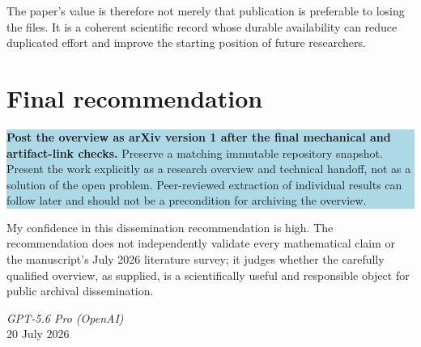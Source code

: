 \documentclass[11pt]{article}
\newcommand{\fboxtext}[1]{%
  \begin{center}
  \setlength{\fboxsep}{10pt}%
  \colorbox{lightblue}{\parbox{0.91\textwidth}{#1}}
  \end{center}
}
\begin{document}
The paper's value is therefore not merely that publication is preferable to losing the files. It is a coherent scientific record whose durable availability can reduce duplicated effort and improve the starting position of future researchers.

\section{Final recommendation}

\fboxtext{%
\textbf{Post the overview as arXiv version 1 after the final mechanical and artifact-link checks.} Preserve a matching immutable repository snapshot. Present the work explicitly as a research overview and technical handoff, not as a solution of the open problem. Peer-reviewed extraction of individual results can follow later and should not be a precondition for archiving the overview.}

My confidence in this dissemination recommendation is high. The recommendation does not independently validate every mathematical claim or the manuscript's July 2026 literature survey; it judges whether the carefully qualified overview, as supplied, is a scientifically useful and responsible object for public archival dissemination.

\vfill
\begin{flushright}
\textit{GPT-5.6 Pro (OpenAI)}\\
20 July 2026
\end{flushright}
\end{document}
